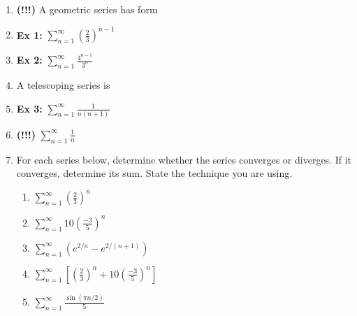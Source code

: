 \documentclass[11pt,fleqn]{article}
\begin{document}
\begin{enumerate}
\item \textbf{(!!!)} A geometric series has form 

\vspace{1 in}

\item \textbf{Ex 1:} $\displaystyle \sum_{n=1}^\infty \left( \frac{2}{3} \right)^{n-1}$

\vfill

\item \textbf{Ex 2:} $\displaystyle \sum_{n=1}^\infty  \frac{4^{n-1}}{3^{n}} $

\vfill

\item A telescoping series is

\vspace{0.5 in}

\item \textbf{Ex 3:} $\displaystyle \sum_{n=1}^\infty \frac{1}{n(n+1)}$

\vfill

\newpage
\item \textbf{(!!!)} \quad \hspace{.7in} \quad \quad $\displaystyle \sum_{n=1}^\infty  \frac{1}{n} $
\vfill

\item For each series below, determine whether the series converges or diverges. If it converges, determine its sum. State the technique you are using.	\begin{enumerate}
	\item $\displaystyle \sum_{n=1}^\infty \left(\frac{2}{3} \right)^n$
	\vfill
	\item $\displaystyle \sum_{n=1}^\infty 10\left(\frac{-3}{5} \right)^n$
	\vfill
	\item $\displaystyle \sum_{n=1}^\infty  (e^{2/n} - e^{2/(n+1)} )$
	\vfill
	\item $\displaystyle \sum_{n=1}^\infty \left[ \left(\frac{2}{3} \right)^{n} + 10\left(\frac{-3}{5} \right)^n \right] $
	\vspace{.5in}
	\item $\displaystyle \sum_{n=1}^\infty  \frac{\sin(\pi n /2)}{5}$
	\vspace{.5in}
	
	\end{enumerate}

\end{enumerate}
\end{document}
